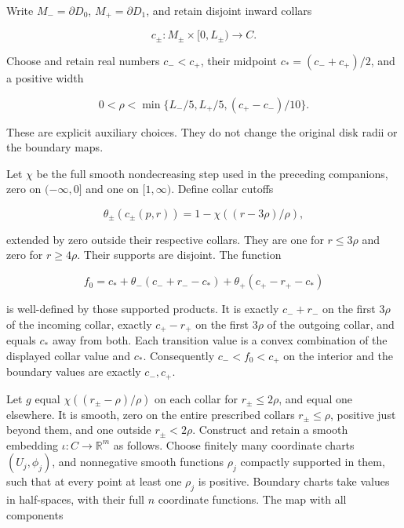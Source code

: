 \label{courseIII:relative-morse-functions-and-original-handles:section-1}\label{courseIII:relative-morse:1}

Write \(M_-=\partial D_0\), \(M_+=\partial D_1\), and retain disjoint inward collars

\begin{equation}
c_\pm:M_\pm\times[0,L_\pm)\longrightarrow C.
\label{courseIII:relative-morse-functions-and-original-handles:eq:1.1}
\end{equation}

Choose and retain real numbers \(c_-<c_+\), their midpoint \(c_*=(c_-+c_+)/2\), and a positive width

\begin{equation}
0<\rho<\min\{L_-/5,L_+/5,(c_+-c_-)/10\}.
\label{courseIII:relative-morse-functions-and-original-handles:eq:1.2}
\end{equation}

These are explicit auxiliary choices. They do not change the original disk radii or the boundary maps.

Let \(\chi\) be the full smooth nondecreasing step used in the preceding companions, zero on \((-\infty,0]\) and one on \([1,\infty)\). Define collar cutoffs

\begin{equation}
\theta_\pm(c_\pm(p,r))=1-\chi((r-3\rho)/\rho),
\label{courseIII:relative-morse-functions-and-original-handles:eq:1.3}
\end{equation}

extended by zero outside their respective collars. They are one for \(r\leq3\rho\) and zero for \(r\geq4\rho\). Their supports are disjoint. The function

\begin{equation}
f_0=c_*+\theta_-(c_-+r_--c_*)
              +\theta_+(c_+-r_+-c_*)
\label{courseIII:relative-morse-functions-and-original-handles:eq:1.4}
\end{equation}

is well-defined by those supported products. It is exactly \(c_-+r_-\) on the first \(3\rho\) of the incoming collar, exactly \(c_+-r_+\) on the first \(3\rho\) of the outgoing collar, and equals \(c_*\) away from both. Each transition value is a convex combination of the displayed collar value and \(c_*\). Consequently \(c_-<f_0<c_+\) on the interior and the boundary values are exactly \(c_-,c_+\).

Let \(g\) equal \(\chi((r_\pm-\rho)/\rho)\) on each collar for \(r_\pm\leq2\rho\), and equal one elsewhere. It is smooth, zero on the entire prescribed collars \(r_\pm\leq\rho\), positive just beyond them, and one outside \(r_\pm<2\rho\). Construct and retain a smooth embedding \(\iota:C\to\mathbb R^m\) as follows. Choose finitely many coordinate charts \((U_j,\phi_j)\), and nonnegative smooth functions \(\rho_j\) compactly supported in them, such that at every point at least one \(\rho_j\) is positive. Boundary charts take values in half-spaces, with their full \(n\) coordinate functions. The map with all components


